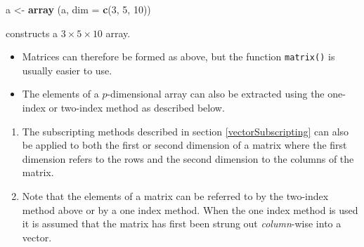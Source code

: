 \documentclass[
]{book}
\newenvironment{Shaded}{\begin{snugshade}}{\end{snugshade}}
\newcommand{\AttributeTok}[1]{\textcolor[rgb]{0.13,0.29,0.53}{#1}}
\newcommand{\DecValTok}[1]{\textcolor[rgb]{0.00,0.00,0.81}{#1}}
\newcommand{\FunctionTok}[1]{\textcolor[rgb]{0.13,0.29,0.53}{\textbf{#1}}}
\newcommand{\NormalTok}[1]{#1}
\newcommand{\OtherTok}[1]{\textcolor[rgb]{0.56,0.35,0.01}{#1}}
\providecommand{\tightlist}{%
  \setlength{\itemsep}{0pt}\setlength{\parskip}{0pt}}
\begin{document}
\begin{Shaded}
\begin{Highlighting}[]
\NormalTok{a }\OtherTok{\textless{}{-}} \FunctionTok{array}\NormalTok{ (a, }\AttributeTok{dim =} \FunctionTok{c}\NormalTok{(}\DecValTok{3}\NormalTok{, }\DecValTok{5}\NormalTok{, }\DecValTok{10}\NormalTok{)) }
\end{Highlighting}
\end{Shaded}

constructs a \(3 \times 5 \times 10\) array.

\begin{itemize}
\tightlist
\item
  Matrices can therefore be formed as above, but the function \texttt{matrix()} is usually easier to use.
\item
  The elements of a \(p\)-dimensional array can also be extracted using the one-index or two-index method as described below.
\end{itemize}

\begin{enumerate}
\def\labelenumi{(\alph{enumi})}
\setcounter{enumi}{2}
\item
  The subscripting methods described in section \ref{vectorSubscripting} can also be applied to both the first or second dimension of a matrix where the first dimension refers to the rows and the second dimension to the columns of the matrix.
\item
  Note that the elements of a matrix can be referred to by the two-index method above or by a one index method. When the one index method is used it is assumed that the matrix has first been strung out \emph{{column}}-wise into a vector.
\end{enumerate}
\end{document}
